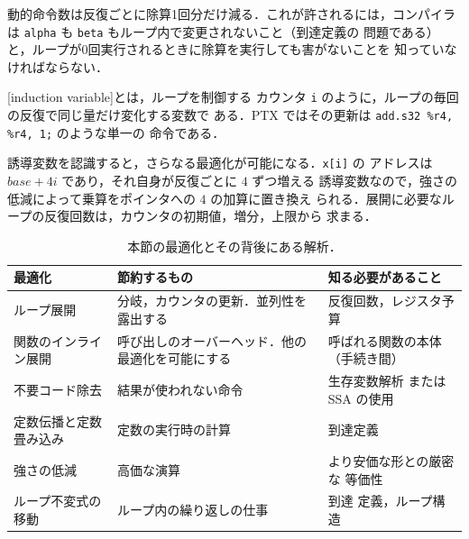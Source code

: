 \documentclass[../main.tex]{subfiles}
\begin{document}
動的命令数は反復ごとに除算1回分だけ減る．これが許されるには，コンパイラは
\texttt{alpha} も \texttt{beta} もループ内で変更されないこと（到達定義の
問題である）と，ループが0回実行されるときに除算を実行しても害がないことを
知っていなければならない．

\begin{definition}[誘導変数]
  \label{def:l11-induction}
  [induction variable]とは，ループを制御する
  カウンタ \texttt{i} のように，ループの毎回の反復で同じ量だけ変化する変数で
  ある．PTX ではその更新は \texttt{add.s32 \%r4, \%r4, 1;} のような単一の
  命令である．
\end{definition}

誘導変数を認識すると，さらなる最適化が可能になる．\texttt{x[i]} の
アドレスは $\mathit{base} + 4i$ であり，それ自身が反復ごとに $4$ ずつ増える
誘導変数なので，強さの低減によって乗算をポインタへの $4$ の加算に置き換え
られる．展開に必要なループの反復回数は，カウンタの初期値，増分，上限から
求まる．

\begin{table}[tb]
  \centering\small
  \begin{tabular}{@{}>{\raggedright\arraybackslash}p{30mm}
                    >{\raggedright\arraybackslash}p{42mm}
                    >{\raggedright\arraybackslash}p{38mm}@{}}
    \toprule
    最適化 & 節約するもの & 知る必要があること \\
    \midrule
    ループ展開 & 分岐，カウンタの更新．並列性を露出する &
      反復回数，レジスタ予算 \\
    関数のインライン展開 & 呼び出しのオーバーヘッド．他の最適化を可能にする &
      呼ばれる関数の本体（手続き間） \\
    不要コード除去 & 結果が使われない命令 & 生存変数解析
      または SSA の使用 \\
    定数伝播と定数畳み込み & 定数の実行時の計算
      & 到達定義 \\
    強さの低減 & 高価な演算 & より安価な形との厳密な
      等価性 \\
    ループ不変式の移動 & ループ内の繰り返しの仕事 & 到達
      定義，ループ構造 \\
    \bottomrule
  \end{tabular}
  \caption{本節の最適化とその背後にある解析．}
  \label{tab:l11-optimizations}
\end{table}
\end{document}
